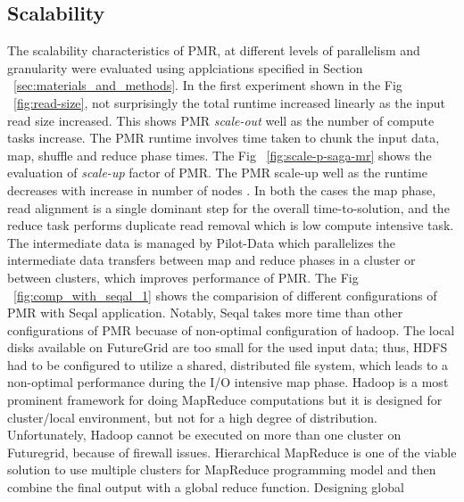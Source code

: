 \documentclass{acm_proc_article-sp}
\begin{document}
\subsection{Scalability}
The scalability characteristics of PMR, at different levels of parallelism and granularity were evaluated using applciations specified in Section ~\ref{sec:materials_and_methods}.
In the first experiment shown in the  Fig ~\ref{fig:read-size}, not surprisingly the total runtime increased linearly as the input read size increased. 
This shows PMR \textit{scale-out} well as the number of  compute tasks increase. The PMR runtime involves time taken 
to chunk the input data, map, shuffle and reduce phase times.  The Fig ~\ref{fig:scale-p-saga-mr} shows the evaluation of \textit{scale-up} factor of PMR. 
The PMR scale-up well as the runtime decreases with increase in number of nodes .
In both the cases the map phase, read alignment is a single dominant step for the overall time-to-solution, and the reduce task performs duplicate read removal 
which is low compute intensive task. The intermediate data is managed by Pilot-Data which parallelizes the intermediate data transfers between 
map and reduce phases in a cluster or between clusters, which improves performance of PMR.
The Fig ~\ref{fig:comp_with_seqal_1} shows the comparision of different configurations of PMR with Seqal application. 
Notably, Seqal takes more time than other configurations of PMR becuase of non-optimal configuration of hadoop. 
The local disks available on FutureGrid are too small for the used input data;  thus, HDFS had to be configured to utilize a shared, distributed file system, 
which leads to a non-optimal performance during the I/O intensive map phase. Hadoop is a most prominent framework for doing MapReduce computations but it is designed for
cluster/local environment, but not for a high degree of distribution. Unfortunately, Hadoop cannot be executed on more than one cluster on Futuregrid, because of firewall issues. 
Hierarchical MapReduce is one of the viable solution to use multiple clusters for  MapReduce programming model and then combine the final output with a global reduce function. Designing global
\end{document}
